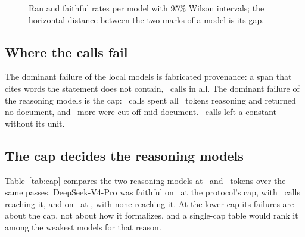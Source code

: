 \documentclass[journal]{IEEEtran}
\begin{document}
\begin{figure}[t]
\centering
{}
\caption{Ran and faithful rates per model with 95\% Wilson intervals; the horizontal distance
between the two marks of a model is its gap.}
\label{fig:rates}
\end{figure}

\subsection{Where the calls fail}

The dominant failure of the local models is fabricated provenance: a span that cites words the
statement does not contain, \nFabricated\ calls in all. The dominant failure of the reasoning models
is the cap: \nNoAnswerCap\ calls spent all \protocolCap\ tokens reasoning and returned no document,
and \nTruncated\ more were cut off mid-document. \nNoUnit\ calls left a constant without its unit.
\callFailedSentence

\subsection{The cap decides the reasoning models}

Table~\ref{tab:cap} compares the two reasoning models at \protocolCap\ and \capHigh\ tokens over the
same passes. DeepSeek-V4-Pro was faithful on \capFaithfulLowDeepseek\ at the protocol's cap, with
\capAtLowDeepseek\ calls reaching it, and on \capFaithfulHighDeepseek\ at \capHigh, with none
reaching it. At the lower cap its failures are about the cap, not about how it formalizes, and a
single-cap table would rank it among the weakest models for that reason.
\end{document}
